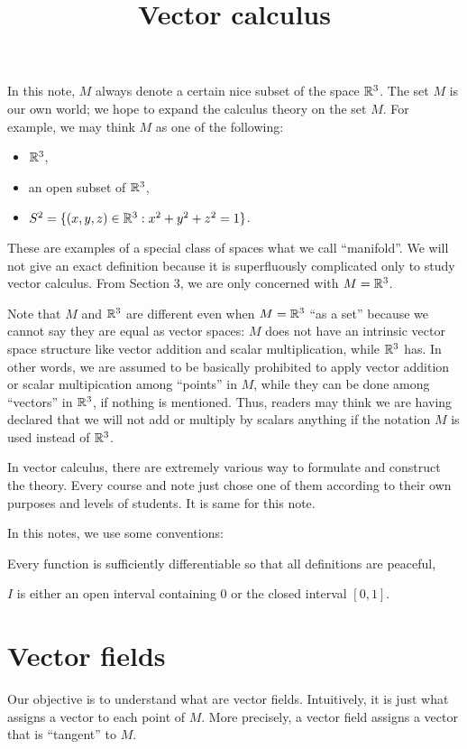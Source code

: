 \documentclass{../exp}
\title{Vector calculus}
\begin{document}
\maketitle
\tableofcontents


In this note, $M$ always denote a certain nice subset of the space $\mathbb{R}^3$.
The set $M$ is our own world; we hope to expand the calculus theory on the set $M$.
For example, we may think $M$ as one of the following:
\begin{itemize}
\item $\mathbb{R}^3$,
\item an open subset of $\mathbb{R}^3$,
\item $S^2=\{(x,y,z)\in\mathbb{R}^3:x^2+y^2+z^2=1\}$.
\end{itemize}
These are examples of a special class of spaces what we call ``manifold''.
We will not give an exact definition because it is superfluously complicated only to study vector calculus.
From Section 3, we are only concerned with $M=\mathbb{R}^3$.

Note that $M$ and $\mathbb{R}^3$ are different even when $M=\mathbb{R}^3$ ``as a set'' because we cannot say they are equal as vector spaces: $M$ does not have an intrinsic vector space structure like vector addition and scalar multiplication, while $\mathbb{R}^3$ has.
In other words, we are assumed to be basically prohibited to apply vector addition or scalar multipication among ``points'' in $M$, while they can be done among ``vectors'' in $\mathbb{R}^3$, if nothing is mentioned.
Thus, readers may think we are having declared that we will not add or multiply by scalars anything if the notation $M$ is used instead of $\mathbb{R}^3$.

In vector calculus, there are extremely various way to formulate and construct the theory.
Every course and note just chose one of them according to their own purposes and levels of students.
It is same for this note.

In this notes, we use some conventions:
\begin{cond}
\item Every function is sufficiently differentiable so that all definitions are peaceful,
\item $I$ is either an open interval containing 0 or the closed interval $[0,1]$.
\end{cond}




\section{Vector fields}
Our objective is to understand what are vector fields.
Intuitively, it is just what assigns a vector to each point of $M$.
More precisely, a vector field assigns a vector that is ``tangent'' to $M$.
\end{document}
